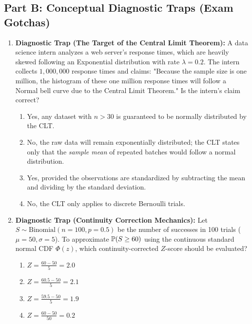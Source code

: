\subsection*{Part B: Conceptual Diagnostic Traps (Exam Gotchas)}

\begin{enumerate}[resume]
\item \textbf{Diagnostic Trap (The Target of the Central Limit Theorem):}
A data science intern analyzes a web server's response times, which are heavily skewed following an Exponential distribution with rate $\lambda = 0.2$. The intern collects $1,000,000$ response times and claims: "Because the sample size is one million, the histogram of these one million response times will follow a Normal bell curve due to the Central Limit Theorem." Is the intern's claim correct?
\begin{enumerate}
    \item Yes, any dataset with $n > 30$ is guaranteed to be normally distributed by the CLT.
    \item No, the raw data will remain exponentially distributed; the CLT states only that the \emph{sample mean} of repeated batches would follow a normal distribution.
    \item Yes, provided the observations are standardized by subtracting the mean and dividing by the standard deviation.
    \item No, the CLT only applies to discrete Bernoulli trials.
\end{enumerate}

\item \textbf{Diagnostic Trap (Continuity Correction Mechanics):}
Let $S \sim \text{Binomial}(n = 100, p = 0.5)$ be the number of successes in 100 trials ($\mu = 50, \sigma = 5$). To approximate $\P(S \ge 60)$ using the continuous standard normal CDF $\Phi(z)$, which continuity-corrected $Z$-score should be evaluated?
\begin{enumerate}
    \item $Z = \frac{60 - 50}{5} = 2.0$
    \item $Z = \frac{60.5 - 50}{5} = 2.1$
    \item $Z = \frac{59.5 - 50}{5} = 1.9$
    \item $Z = \frac{60 - 50}{50} = 0.2$
\end{enumerate}
\end{enumerate}
